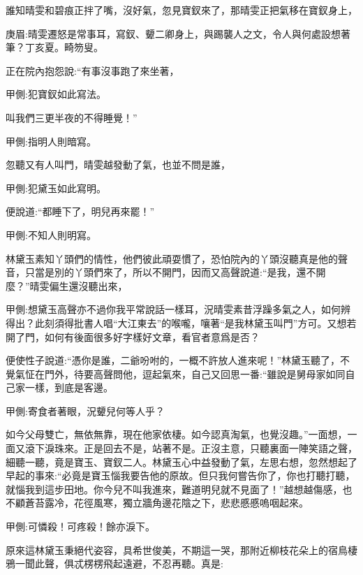 \begin{parag}
    誰知晴雯和碧痕正拌了嘴，沒好氣，忽見寶釵來了，那晴雯正把氣移在寶釵身上，\begin{note}庚眉:晴雯遷怒是常事耳，寫釵、顰二卿身上，與踢襲人之文，令人與何處設想著筆？丁亥夏。畸笏叟。\end{note}正在院內抱怨說:“有事沒事跑了來坐著，\begin{note}甲側:犯寶釵如此寫法。\end{note}叫我們三更半夜的不得睡覺！”\begin{note}甲側:指明人則暗寫。\end{note}忽聽又有人叫門，晴雯越發動了氣，也並不問是誰，\begin{note}甲側:犯黛玉如此寫明。\end{note}便說道:“都睡下了，明兒再來罷！”\begin{note}甲側:不知人則明寫。\end{note}林黛玉素知丫頭們的情性，他們彼此頑耍慣了，恐怕院內的丫頭沒聽真是他的聲音，只當是別的丫頭們來了，所以不開門，因而又高聲說道:“是我，還不開麼？”晴雯偏生還沒聽出來，\begin{note}甲側:想黛玉高聲亦不過你我平常說話一樣耳，況晴雯素昔浮躁多氣之人，如何辨得出？此刻須得批書人唱“大江東去”的喉嚨，嚷著“是我林黛玉叫門”方可。又想若開了門，如何有後面很多好字樣好文章，看官者意爲是否？\end{note}便使性子說道:“憑你是誰，二爺吩咐的，一概不許放人進來呢！”林黛玉聽了，不覺氣怔在門外，待要高聲問他，逗起氣來，自己又回思一番:“雖說是舅母家如同自己家一樣，到底是客邊。\begin{note}甲側:寄食者著眼，況顰兒何等人乎？\end{note}如今父母雙亡，無依無靠，現在他家依棲。如今認真淘氣，也覺沒趣。”一面想，一面又滾下淚珠來。正是回去不是，站著不是。正沒主意，只聽裏面一陣笑語之聲，細聽一聽，竟是寶玉、寶釵二人。林黛玉心中益發動了氣，左思右想，忽然想起了早起的事來:“必竟是寶玉惱我要告他的原故。但只我何嘗告你了，你也打聽打聽，就惱我到這步田地。你今兒不叫我進來，難道明兒就不見面了！”越想越傷感，也不顧蒼苔露冷，花徑風寒，獨立牆角邊花陰之下，悲悲慼慼嗚咽起來。\begin{note}甲側:可憐殺！可疼殺！餘亦淚下。\end{note}
\end{parag}


\begin{parag}
    原來這林黛玉秉絕代姿容，具希世俊美，不期這一哭，那附近柳枝花朵上的宿鳥棲鴉一聞此聲，俱忒楞楞飛起遠避，不忍再聽。真是:
\end{parag}


